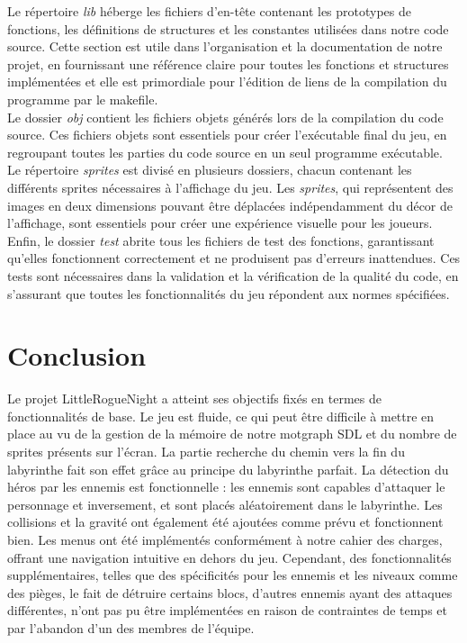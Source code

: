 \documentclass[10pt]{article}
\begin{document}
Le répertoire \textit{lib} héberge les fichiers d'en-tête contenant les prototypes de fonctions, les définitions de structures et les constantes utilisées dans notre code source. Cette section est utile dans l'organisation et la documentation de notre projet, en fournissant une référence claire pour toutes les fonctions et structures implémentées et elle est primordiale pour l'édition de liens de la compilation du programme par le makefile.\\

Le dossier \textit{obj} contient les fichiers objets générés lors de la compilation du code source. Ces fichiers objets sont essentiels pour créer l'exécutable final du jeu, en regroupant toutes les parties du code source en un seul programme exécutable.\\

Le répertoire \textit{sprites} est divisé en plusieurs dossiers, chacun contenant les différents sprites nécessaires à l'affichage du jeu. Les \textit{\gls{sprites}}, qui représentent des images en deux dimensions pouvant être déplacées indépendamment du décor de l'affichage, sont essentiels pour créer une expérience visuelle pour les joueurs.\\

Enfin, le dossier \textit{test} abrite tous les fichiers de test des fonctions, garantissant qu'elles fonctionnent correctement et ne produisent pas d'erreurs inattendues. Ces tests sont nécessaires dans la validation et la vérification de la qualité du code, en s'assurant que toutes les fonctionnalités du jeu répondent aux normes spécifiées.

\clearpage
\section{Conclusion}

Le projet LittleRogueNight a atteint ses objectifs fixés en termes de fonctionnalités de base. Le jeu est fluide, ce qui peut être difficile à mettre en place au vu de la gestion de la mémoire de notre \gls{motgraph} SDL et du nombre de \gls{sprites} présents sur l'écran. La partie recherche du chemin vers la fin du labyrinthe fait son effet grâce au principe du labyrinthe parfait. La détection du héros par les ennemis est fonctionnelle : les ennemis sont capables d'attaquer le personnage et inversement, et sont placés aléatoirement dans le labyrinthe. Les collisions et la gravité ont également été ajoutées comme prévu et fonctionnent bien. Les menus ont été implémentés conformément à notre cahier des charges, offrant une navigation intuitive en dehors du jeu. Cependant, des fonctionnalités supplémentaires, telles que des spécificités pour les ennemis et les niveaux comme des pièges, le fait de détruire certains blocs, d'autres ennemis ayant des attaques différentes, n'ont pas pu être implémentées en raison de contraintes de temps et par l'abandon d'un des membres de l'équipe. \\
\end{document}
